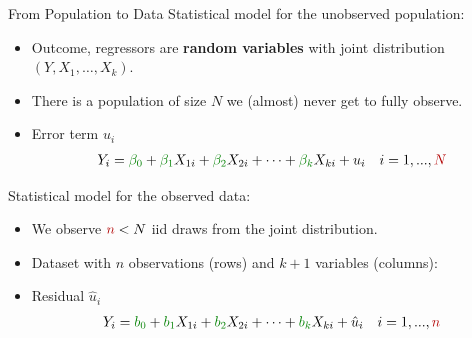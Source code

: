 \documentclass[9pt,aspectratio=169]{beamer}
\begin{document}
\begin{frame}{From Population to Data}
Statistical model for the unobserved \textcolor{red!70!black}{population}:
\begin{itemize}
    \item Outcome, regressors are \textbf{random variables} with joint distribution $(Y, X_1, …, X_k)$. 
    \item There is a population of size \textcolor{red!70!black}{$N$} we (almost) never get to fully observe.
    \item Error term $u_i$
    \begin{align*}
    Y_i = \textcolor{green!50!black}{\beta_0} + \textcolor{green!50!black}{\beta_1} X_{1i} + \textcolor{green!50!black}{\beta_2} X_{2i} + \cdots + \textcolor{green!50!black}{\beta_k} X_{ki} + u_i \quad i = 1, ..., \textcolor{red!70!black}{N}
    \end{align*}
\end{itemize}
\pause
Statistical model for the observed \textcolor{red!70!black}{data}:
\begin{itemize}
    \item We observe $\textcolor{red!70!black}{n} < N$ iid draws from the joint distribution.
    \item \textcolor{red!70!black}{Dataset} with $n$ observations (rows) and $k+1$ variables (columns):
    \item Residual $\hat{u}_i$
    \begin{align*}
    Y_i = \textcolor{green!50!black}{b_0} + \textcolor{green!50!black}{b_1 }X_{1i} + \textcolor{green!50!black}{b_2} X_{2i} + \cdots + \textcolor{green!50!black}{b_k} X_{ki} + \hat{u}_i \quad i = 1, ..., \textcolor{red!70!black}{n}
    \end{align*}
\end{itemize}

\end{frame}
\end{document}
